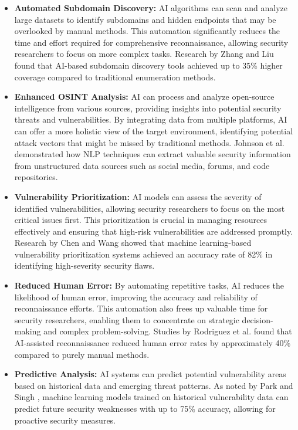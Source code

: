 \documentclass[conference]{IEEEtran}
\begin{document}
\begin{itemize}
    \item \textbf{Automated Subdomain Discovery:} AI algorithms can scan and analyze large datasets to identify subdomains and hidden endpoints that may be overlooked by manual methods. This automation significantly reduces the time and effort required for comprehensive reconnaissance, allowing security researchers to focus on more complex tasks. Research by Zhang and Liu \cite{zhang2020} found that AI-based subdomain discovery tools achieved up to 35\% higher coverage compared to traditional enumeration methods.

    \item \textbf{Enhanced OSINT Analysis:} AI can process and analyze open-source intelligence from various sources, providing insights into potential security threats and vulnerabilities. By integrating data from multiple platforms, AI can offer a more holistic view of the target environment, identifying potential attack vectors that might be missed by traditional methods. Johnson et al. \cite{johnson2021} demonstrated how NLP techniques can extract valuable security information from unstructured data sources such as social media, forums, and code repositories.

    \item \textbf{Vulnerability Prioritization:} AI models can assess the severity of identified vulnerabilities, allowing security researchers to focus on the most critical issues first. This prioritization is crucial in managing resources effectively and ensuring that high-risk vulnerabilities are addressed promptly. Research by Chen and Wang \cite{chen2022} showed that machine learning-based vulnerability prioritization systems achieved an accuracy rate of 82\% in identifying high-severity security flaws.

    \item \textbf{Reduced Human Error:} By automating repetitive tasks, AI reduces the likelihood of human error, improving the accuracy and reliability of reconnaissance efforts. This automation also frees up valuable time for security researchers, enabling them to concentrate on strategic decision-making and complex problem-solving. Studies by Rodriguez et al. \cite{rodriguez2020} found that AI-assisted reconnaissance reduced human error rates by approximately 40\% compared to purely manual methods.
    
    \item \textbf{Predictive Analysis:} AI systems can predict potential vulnerability areas based on historical data and emerging threat patterns. As noted by Park and Singh \cite{park2021}, machine learning models trained on historical vulnerability data can predict future security weaknesses with up to 75\% accuracy, allowing for proactive security measures.
    

\end{itemize}
\end{document}
